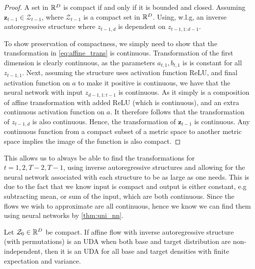 \begin{proof}
    A set in \(\mathbb{R}^D\) is compact if and only if it is bounded and closed. Assuming \(\bm z_{t-1} \in \mathcal{Z}_{t-1}\), 
    where \(\mathcal{Z}_{t-1}\) is a compact set in \(\mathbb{R}^D\). 
    Using, w.l.g, an inverse autoregressive structure where \(z_{t-1,d}\) is dependent on \(z_{t-1,1:d-1}\).
    
    To show preservation of compactness, we simply need to show that the transformation in \cref{eq:affine_trans} is 
    continuous. Transformation of the first dimension is clearly continuous, as the parameters \(a_{t,1}, b_{t,1}\) is
    is constant for all \(z_{t-1,1}\). Next, assuming the structure uses activation function ReLU, and final 
    activation function on \(a\) to make it positive is continuous, we have that the neural network with input \(z_{d-1,1:t-1}\)
    is continuous. As it simply is a composition of affine transformation with added ReLU (which is continuous), and an extra
    continuous activation function on \(a\). It therefore follows that the transformation of \(z_{t-1,d}\) is also continuous.
    Hence, the transformation of \(\bm z_{t-1}\) is continuous. Any continuous function from a compact subset of a metric space
    to another metric space implies the image of the function is also compact. 
\end{proof}
This allows us to always be able to find the transformations for \(t=1,2,T-2, T-1\), using inverse autoregressive structures
and allowing for the neural network associated with each structure to be as large as one needs. This is due to the fact
that we know input is compact and output is either constant, e.g subtracting mean, or sum of the input, which are both
continuous. Since the flows we wish to approximate are all continuous, hence we know we can find them using neural networks by \cref{thm:uni_nn}.
\begin{proposition}
    Let \(\mathcal{Z}_0 \in \mathbb{R}^D\) be compact. If affine flow with inverse autoregressive structure (with permutations) is an
    UDA when both base and target distribution are non-independent, then it is an UDA for all base and target densities with
    finite expectation and variance.
\end{proposition}
